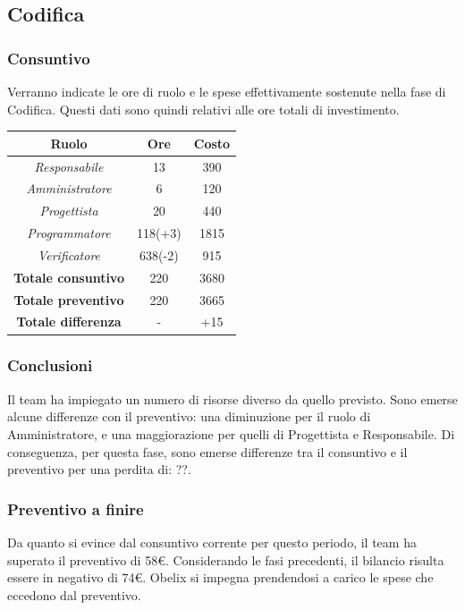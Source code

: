 \subsection{Codifica}

\subsubsection{Consuntivo}

Verranno indicate le ore di ruolo e le spese effettivamente sostenute nella fase di Codifica. Questi dati sono quindi relativi alle ore totali di investimento.

\begin{center}
	\centering
	\begin{tabular}{|c|c|c|}
		\hline
		\textbf{Ruolo} & \textbf{Ore} & \textbf{Costo} \\
		\hline
		\emph{Responsabile}  & 13 & 390 \\
		\hline  \emph{Amministratore}  & 6 & 120 \\
		\hline  \emph{Progettista}  & 20 & 440 \\
		\hline  \emph{Programmatore}  & 118(+3) & 1815 \\
		\hline  \emph{Verificatore}  & 638(-2) & 915 \\
		\hline
		\textbf{Totale consuntivo} & 220 & 3680 \\
		\hline
		\textbf{Totale preventivo} & 220 &  3665\\
		\hline
		\textbf{Totale differenza} & - & +15 \\
		\hline
	\end{tabular}
	
\end{center}

\subsubsection{Conclusioni}

Il team ha impiegato un numero di risorse diverso da quello previsto. Sono emerse alcune differenze con il preventivo: una diminuzione per il ruolo di Amministratore, e una maggiorazione per quelli di Progettista e Responsabile. Di conseguenza, per questa fase, sono emerse differenze tra il consuntivo e il preventivo per una perdita di: ??.

\subsubsection{Preventivo a finire}
Da quanto si evince dal consuntivo corrente per questo periodo, il team ha superato il preventivo
di 58€. Considerando le fasi precedenti, il bilancio risulta essere in negativo di 74€. Obelix si impegna prendendosi a carico le spese che eccedono dal preventivo. 


